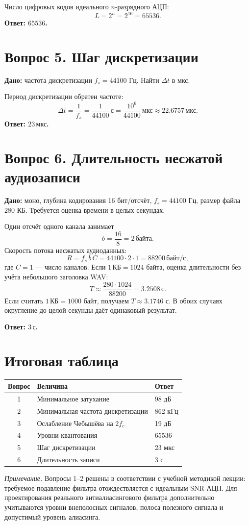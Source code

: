 \documentclass[12pt,a4paper]{article}
\begin{document}
Число цифровых кодов идеального $n$-разрядного АЦП:
\[
L=2^n=2^{16}=65536.
\]
\textbf{Ответ: $\boxed{65536}$.}

\section*{Вопрос 5. Шаг дискретизации}
\textbf{Дано:} частота дискретизации $f_s=44100$ Гц. Найти $\Delta t$ в мкс.

Период дискретизации обратен частоте:
\[
\Delta t=\frac1{f_s}=\frac1{44100}\,\text{с}
=\frac{10^6}{44100}\,\text{мкс}
\approx22.6757\,\text{мкс}.
\]
\textbf{Ответ: $\boxed{23\,\text{мкс}}$.}

\section*{Вопрос 6. Длительность несжатой аудиозаписи}
\textbf{Дано:} моно, глубина кодирования 16 бит/отсчёт, $f_s=44100$ Гц, размер файла 280 КБ. Требуется оценка времени в целых секундах.

Один отсчёт одного канала занимает
\[
b=\frac{16}{8}=2\,\text{байта}.
\]
Скорость потока несжатых аудиоданных:
\[
R=f_s\,b\,C=44100\cdot2\cdot1=88200\,\text{байт/с},
\]
где $C=1$ --- число каналов. Если $1\,\text{КБ}=1024$ байта, оценка длительности без учёта небольшого заголовка WAV:
\[
T\approx\frac{280\cdot1024}{88200}=3.2508\,\text{с}.
\]
Если считать $1\,\text{КБ}=1000$ байт, получаем $T\approx3.1746$ с. В обоих случаях округление до целой секунды даёт одинаковый результат.

\textbf{Ответ: $\boxed{3\,\text{с}}$.}

\section*{Итоговая таблица}
\begin{center}
\begin{tabular}{cll}
\toprule
Вопрос & Величина & Ответ \\
\midrule
1 & Минимальное затухание & 98 дБ \\
2 & Минимальная частота дискретизации & 862 кГц \\
3 & Ослабление Чебышёва на $2f_c$ & 19 дБ \\
4 & Уровни квантования & 65536 \\
5 & Шаг дискретизации & 23 мкс \\
6 & Длительность записи & 3 с \\
\bottomrule
\end{tabular}
\end{center}
\noindent\textit{Примечание.} Вопросы 1--2 решены в соответствии с учебной методикой лекции: требуемое подавление фильтра отождествляется с идеальным SNR АЦП. Для проектирования реального антиалиасингового фильтра дополнительно учитываются уровни внеполосных сигналов, полоса полезного сигнала и допустимый уровень алиасинга.
\end{document}
